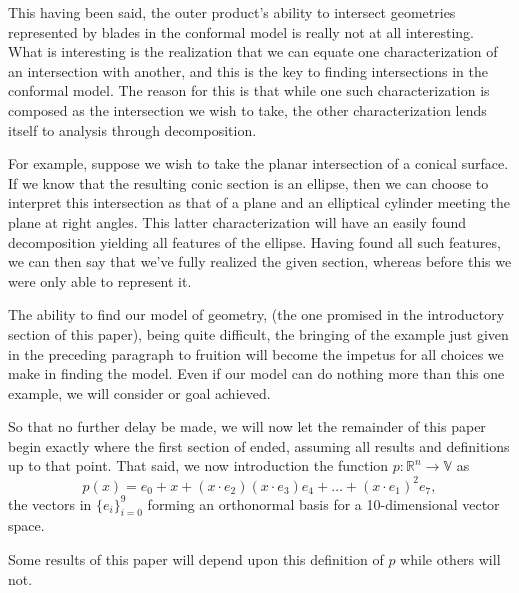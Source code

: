 \documentclass{birkjour}
\theoremstyle{definition}
\theoremstyle{remark}
\numberwithin{equation}{section}
\newcommand{\R}{\mathbb{R}}
\newcommand{\V}{\mathbb{V}}
\begin{document}
This having been said, the outer product's ability to intersect geometries represented
by blades in the conformal model is really not at all interesting.  What is interesting
is the realization that we can equate one characterization of an intersection
with another, and this is the key to finding intersections in the conformal model.
The reason for this is that while one such characterization is composed as the
intersection we wish to take, the other characterization lends itself to
analysis through decomposition.

For example, suppose we wish to take the planar intersection of a conical surface.
If we know that the resulting conic section is an ellipse, then we can choose to
interpret this intersection as that of a plane and an elliptical cylinder meeting
the plane at right angles.  This latter characterization will have an easily found decomposition
yielding all features of the ellipse.  Having found all such features, we can then say that we've
fully realized the given section, whereas before this we were only able to represent it.

The ability to find our model of geometry, (the one promised in the introductory section of
this paper), being quite difficult, the bringing of the example just given in the preceding paragraph
to fruition will become the impetus for all choices we make in finding the model.
Even if our model can do nothing more than this one example, we will consider or goal achieved.

So that no further delay be made, we will now let the remainder of this paper begin
exactly where the first section of \cite{} ended, assuming all results and definitions up to that point.
That said, we now introduction the function $p:\R^n\to\V$ as
\begin{equation}
p(x) = e_0 + x + (x\cdot e_2)(x\cdot e_3)e_4 + \dots + (x\cdot e_1)^2e_7,
\end{equation}
the vectors in $\{e_i\}_{i=0}^9$ forming an orthonormal basis for a 10-dimensional vector space.

Some results of this paper will depend upon this definition of $p$ while
others will not.
\end{document}

